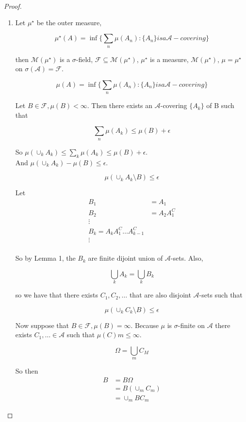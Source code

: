 \documentclass[11pt,fleqn]{book} %
\begin{document}
\begin{proof}
	\begin{enumerate}
		\item Let $\mu^\star$ be the outer measure, 

				$$\mu^\star(A) = \inf\{\sum_n \mu(A_n): \{A_n\} is a \mathcal{A}-covering\} $$

		then $\mathcal{M}(\mu^\star)$ is a $\sigma$-field, $\mathcal{F} \subseteq \mathcal{M}(\mu^\star)$, $\mu^\star$ is a measure, $\mathcal{M}(\mu^\star)$, $\mu = \mu^\star$ on $\sigma(\mathcal{A}) = \mathcal{F}$.

				$$\mu(A) = \inf\{\sum_n \mu(A_n): \{A_n\} is a \mathcal{A}-covering\} $$

Let $B \in \mathcal{F}, \mu(B) < \infty$. Then there exists an $\mathcal{A}$-covering $\{A_k\}$ of B such that

				$$\sum_n \mu(A_k) \leq \mu(B) + \epsilon $$

		So $\mu(\cup_k A_k) \leq \sum_k \mu(A_k) \leq \mu(B) + \epsilon$.\\

		And $\mu(\cup_k A_k) - \mu(B) \leq \epsilon$. 

				$$ \mu(\cup_k A_k \setminus B) \leq \epsilon$$

		Let 
				\begin{align*}
					B_1 &= A_1\\
					B_2 &= A_2A_1^C\\
					\vdots\\
					B_k = A_k A_1^C \dots A_{k-1}^C\\
					\vdots\\
				\end{align*}

		So by Lemma 1, the $B_k$ are finite dijoint union of $\mathcal{A}$-sets. Also, 

				$$\bigcup_k A_k = \bigcup_k B_k $$

		so we have that there exists $C_1, C_2, \dots$ that are also disjoint $\mathcal{A}$-sets such that 

				$$\mu(\cup_k C_k \setminus B) \leq \epsilon $$


Now suppose that $B \in \mathcal{F}, \mu(B) = \infty$. Because $\mu$ is $\sigma$-finite on $\mathcal{A}$ there exists $C_1, \dots \in \mathcal{A}$ such that $\mu(C)m \leq \infty$. 

				$$\Omega = \bigcup_m C_M$$

		So then 
			\begin{align*}
				B &= B\Omega\\
					&= B(\cup_m C_m)\\
					&= \cup_m B C_m
			\end{align*}


\end{enumerate}
\end{proof}
\end{document}

